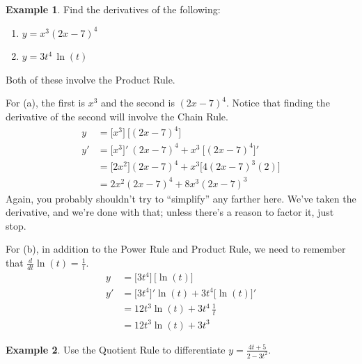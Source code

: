 \documentclass[oneside]{book}
\newcommand{\deriv}[2]{\frac{d#1}{d#2}}
\newcommand{\ddt}{\deriv {}t}
\theoremstyle{definition}
\newtheorem{example}{Example}
\theoremstyle{solution}
\newtheorem*{solution}{Solution}
\newenvironment{solution}{\vspace{2in}\comment}{\endcomment}
\begin{document}
\begin{example}
Find the derivatives of the following:
  \begin{enumerate}
  \item $y = x^3(2x-7)^4$
  \item $y = 3t^4 \, \ln(t)$
  \end{enumerate}
\end{example}

\begin{solution} 
Both of these involve the Product Rule.

For (a), the first is $x^3$ and the second is $(2x-7)^4$.  Notice that
finding the derivative of the second will involve the Chain Rule.
  \begin{align*}
  y  & = \big[x^3\big] \ \big[(2x-7)^4\big]                                        \\
  y' & = \big[x^3\big]' \ (2x-7)^4 + x^3\ \big[(2x-7)^4\big]' \\
           & = \big[2x^2\big](2x-7)^4 + x^3\big[4(2x-7)^3(2)\big]                        \\
           & = 2x^2(2x-7)^4 + 8x^3(2x-7)^3
  \end{align*}
  Again, you probably shouldn't try to ``simplify'' any farther here.
  We've taken the derivative, and we're done with that; unless there's
  a reason to factor it, just stop.  \bigskip
  
  For (b), in addition to the Power Rule and Product Rule, we need to
  remember that $\ddt\ln(t) = \frac{1}{t}$.
  \begin{align*}
  y & = \big[3t^4\big]\,\big[\ln(t)\big]\\
  y' & = \big[3t^4\big]'\ln(t) + 3t^4\big[\ln(t)\big]'\\
  & = 12t^3\ln(t) + 3t^4\, \frac{1}{t}\\
  & = 12t^3\ln(t) + 3t^3
  \end{align*}
\end{solution}

\begin{example}
Use the Quotient Rule to differentiate $y = \frac{4t+5}{2-3t^2}$.
\end{example}
\end{document}
